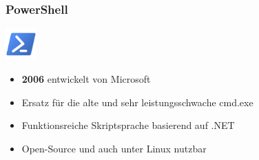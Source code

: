 \begin{frame}
    \frametitle{PowerShell}
    \includegraphics[height=1.2cm]{res/powershell.png}
    \begin{itemize}
        \item \textbf{2006} entwickelt von Microsoft
        \item Ersatz für die alte und sehr leistungsschwache cmd.exe
        \item Funktionsreiche Skriptsprache basierend auf .NET
        \item Open-Source und auch unter Linux nutzbar
    \end{itemize}
\end{frame}
